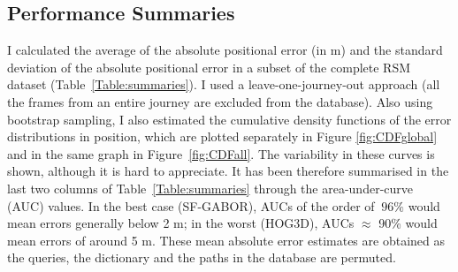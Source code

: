 \subsection{Performance Summaries}
\label{visloc_perf}
I calculated the average of the absolute positional error (in m) and the standard deviation of the absolute positional error in a subset of the complete RSM dataset (Table~\ref{Table:summaries}). I  used a leave-one-journey-out approach (all the frames from an entire journey are excluded from the database).  Also using bootstrap sampling, I also estimated the cumulative density functions of the error distributions in position, which are plotted separately in Figure \ref{fig:CDFglobal} and in the same graph in Figure~\ref{fig:CDFall}. The variability in these curves is shown, although it is hard to appreciate. It has been therefore summarised in the last two columns of Table~\ref{Table:summaries} through the area-under-curve (AUC) values. In the best case (SF-GABOR), AUCs of the order of $~96\%$ would mean errors generally below 2 m; in the worst (HOG3D), AUCs $\approx$ 90\% would mean errors of around 5 m.  These  mean absolute error estimates are obtained as the queries, the dictionary and the paths in the database are permuted. 


